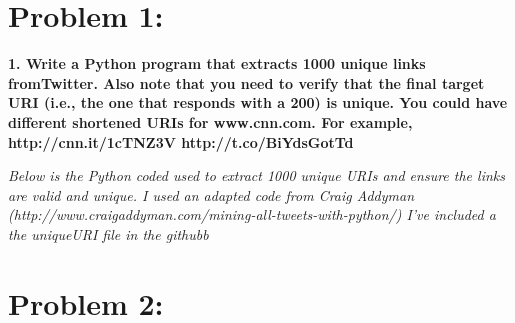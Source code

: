\documentclass{article}
\begin{document}
    



\section{Problem 1:}
\label{Problem 1}

{\bf 1.  Write a Python program that extracts 1000 unique links fromTwitter.  
\newline\newline
Also note that you need to verify that the final target URI (i.e., the one that responds with a 200) is unique.  You could have different shortened URIs for www.cnn.com.  \newline
For example, 
\newline
http://cnn.it/1cTNZ3V\newline
http://t.co/BiYdsGotTd\newline
} 

{\it Below is the Python coded used to extract 1000 unique URIs and ensure the links are valid and unique.\newline
I used an adapted code from Craig Addyman (http://www.craigaddyman.com/mining-all-tweets-with-python/)
\newline
I've included a the uniqueURI file in the githubb
\newline\newline

}




\newpage
\section{Problem 2:}
\label{Problem 2}
\end{document}
